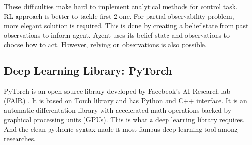 These difficulties make hard to implement analytical methods for control task. RL approach is better to tackle first 2 one. For partial observability problem, more elegant solution is required. This is done by creating a belief state from past observations to inform agent. Agent uses its belief state and observations to choose how to act. However, relying on observations is also possible. \\
\subsection{Deep Learning Library: PyTorch}
\label{dl_pytorch}
PyTorch is an open source library developed by Facebook's AI Research lab (FAIR) \cite{paszke_pytorch_2019}. It is based on Torch library \cite{collobert_torch7_2011} and has Python and C++ interface. It is an automatic differentation library with accelerated math operations backed by graphical processing units (GPUs). This is what a deep learning library requires. And the clean pythonic syntax made it most famous deep learning tool among researches. 
